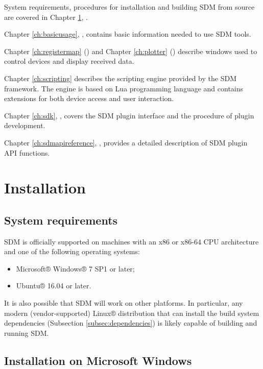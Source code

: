 \documentclass[a4paper,12pt,twoside,extrafontsizes]{memoir}
\begin{document}
System requirements, procedures for installation and building SDM from source are covered in Chapter \ref{ch:installation}, .

Chapter \ref{ch:basicusage}, , contains basic information needed to use SDM tools.

Chapter \ref{ch:registermap} () and Chapter \ref{ch:plotter} () describe  windows used to control devices and display received data.

Chapter \ref{ch:scripting} describes the scripting engine provided by the SDM framework. The engine is based on Lua programming language and contains extensions for both device access and user interaction.

Chapter \ref{ch:sdk}, , covers the SDM plugin interface and the procedure of plugin development.

Chapter \ref{ch:sdmapireference}, , provides a detailed description of SDM plugin API functions.

\chapter{Installation}
\label{ch:installation}

\section{System requirements}

SDM is officially supported on machines with an x86 or x86-64 CPU architecture and one of the following operating systems:

\begin{itemize}
	\item Microsoft® Windows® 7 SP1 or later;
	\item Ubuntu® 16.04 or later.
\end{itemize}

It is also possible that SDM will work on other platforms. In particular, any modern (vendor-supported) Linux® distribution that can install the build system dependencies (Subsection \ref{subsec:dependencies}) is likely capable of building and running SDM.

\section{Installation on Microsoft Windows}
\end{document}
